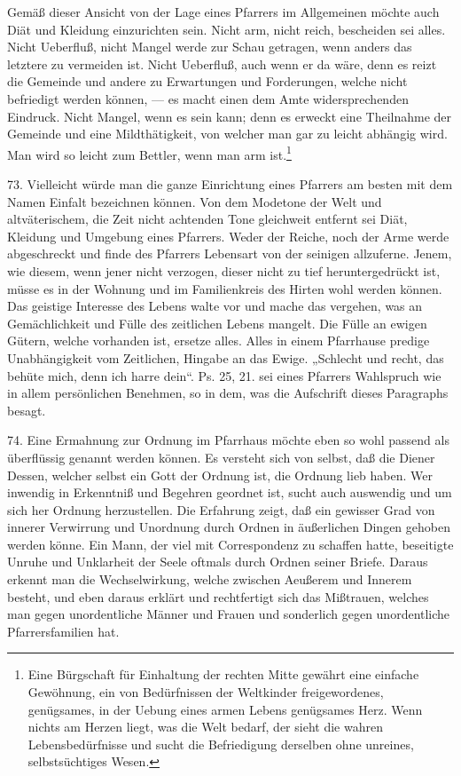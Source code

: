 Gemäß dieser Ansicht von der Lage eines Pfarrers im Allgemeinen möchte auch Diät und Kleidung einzurichten sein. Nicht arm, nicht reich, bescheiden sei alles. Nicht Ueberfluß, nicht Mangel werde zur Schau getragen, wenn anders das letztere zu vermeiden ist. Nicht Ueberfluß, auch wenn er da wäre, denn es reizt die Gemeinde und andere zu Erwartungen und Forderungen,
welche nicht befriedigt werden können, — es macht einen dem Amte widersprechenden Eindruck. Nicht Mangel, wenn es sein kann; denn es erweckt eine Theilnahme der Gemeinde und eine Mildthätigkeit, von welcher man gar zu leicht abhängig wird. Man wird so leicht zum Bettler, wenn man arm ist.\footnote{Eine Bürgschaft für Einhaltung der rechten Mitte gewährt eine einfache Gewöhnung, ein von Bedürfnissen der Weltkinder freigewordenes, genügsames, in der Uebung eines armen Lebens genügsames Herz. Wenn nichts am Herzen liegt, was die Welt bedarf, der sieht die wahren Lebensbedürfnisse und sucht die Befriedigung derselben ohne unreines, selbstsüchtiges Wesen.}

73. Vielleicht würde man die ganze Einrichtung eines Pfarrers am besten mit dem Namen Einfalt bezeichnen können. Von dem Modetone der Welt und altväterischem, die Zeit nicht achtenden Tone gleichweit entfernt sei Diät, Kleidung und Umgebung eines Pfarrers. Weder der Reiche, noch der Arme werde abgeschreckt und finde des Pfarrers Lebensart von der seinigen allzuferne. Jenem, wie diesem, wenn jener nicht verzogen, dieser nicht zu tief heruntergedrückt ist, müsse es in der Wohnung und im Familienkreis des Hirten wohl werden können. Das geistige Interesse des Lebens walte vor und mache das vergehen, was an Gemächlichkeit und Fülle des zeitlichen Lebens mangelt. Die Fülle an ewigen Gütern, welche vorhanden ist, ersetze alles. Alles in einem Pfarrhause predige Unabhängigkeit vom Zeitlichen, Hingabe an das Ewige. „Schlecht und recht, das behüte mich, denn ich harre dein“. Ps. 25, 21. sei eines Pfarrers Wahlspruch wie in allem persönlichen
Benehmen, so in dem, was die Aufschrift dieses Paragraphs besagt.

74. Eine Ermahnung zur Ordnung im Pfarrhaus möchte eben so wohl passend als überflüssig genannt werden können. Es versteht sich von selbst, daß die Diener Dessen, welcher selbst ein Gott der Ordnung ist, die Ordnung lieb haben. Wer inwendig in Erkenntniß und Begehren geordnet ist, sucht auch auswendig und um sich her Ordnung herzustellen. Die Erfahrung zeigt, daß ein gewisser Grad von innerer Verwirrung und Unordnung durch Ordnen in äußerlichen Dingen gehoben werden könne. Ein Mann, der viel mit Correspondenz zu schaffen hatte, beseitigte Unruhe und Unklarheit der Seele oftmals durch Ordnen seiner Briefe. Daraus erkennt man die Wechselwirkung, welche zwischen Aeußerem und Innerem besteht, und eben daraus erklärt und rechtfertigt sich das Mißtrauen, welches man gegen unordentliche Männer und Frauen und sonderlich gegen unordentliche Pfarrersfamilien hat.

